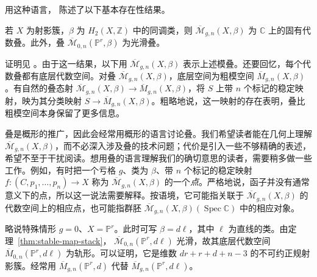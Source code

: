 用这种语言， 陈述了以下基本存在性结果。

\begin{theorem}\label{thm:stable-map-stack}
若 $X$ 为射影簇，$\beta$ 为 $H_2(X,\mathbb Z)$ 中的同调类，则
$\overline{\mathcal M}_{g,n}(X,\beta)$ 为 $\mathbb C$ 上的固有代数叠。此外，叠 $\overline{\mathcal M}_{0,n}(\mathbb P^r,\beta)$ 为光滑叠。
\end{theorem}
证明见 。由于这一结果，以下用 $\overline{\mathcal M}_{g,n}(X,\beta)$ 表示上述模叠。还要回忆，每个代数叠都有底层代数空间。对叠 $\overline{\mathcal M}_{g,n}(X,\beta)$，底层空间为粗模空间 $\overline M_{g,n}(X,\beta)$。有自然的叠态射
$\overline{\mathcal M}_{g,n}(X,\beta)\to\overline M_{g,n}(X,\beta)$，将 $S$ 上带 $n$ 个标记的稳定映射，映为其分类映射 $S\to\overline M_{g,n}(X,\beta)$。粗略地说，这一映射的存在表明，叠比粗模空间本身保留了更多信息。

叠是概形的推广，因此会经常用概形的语言讨论叠。我们希望读者能在几何上理解
$\overline{\mathcal M}_{g,n}(X,\beta)$，而不必深入涉及叠的技术问题；代价是引入一些不够精确的表述，希望不至于干扰阅读。想用叠的语言理解我们的确切意思的读者，需要稍多做一些工作。例如，有时把一个亏格 $g$、类为 $\beta$、带 $n$ 个标记的稳定映射
$f:(C,p_1,\ldots,p_n)\to X$ 称为 $\overline{\mathcal M}_{g,n}(X,\beta)$ 的一个\emph{点}。严格地说，函子并没有通常意义下的点，所以这一说法需要解释。按语境，它可能指关联于 $\overline{\mathcal M}_{g,n}(X,\beta)$ 的代数空间上的相应点，也可能指群胚
$\overline{\mathcal M}_{g,n}(X,\beta)(\operatorname{Spec}\mathbb C)$ 中的相应对象。

略说特殊情形 $g=0$、$X=\mathbb P^r$。此时可写 $\beta=d\ell$，其中 $\ell$ 为直线的类。由定理~\ref{thm:stable-map-stack}，
$\overline{\mathcal M}_{0,n}(\mathbb P^r,d\ell)$ 光滑，故其底层代数空间
$\overline M_{0,n}(\mathbb P^r,d\ell)$ 为轨形。可以证明，它是维数
$dr+r+d+n-3$ 的不可约正规射影簇。经常用 $\overline M_{g,n}(\mathbb P^r,d)$ 代替
$\overline M_{g,n}(\mathbb P^r,d\ell)$。

